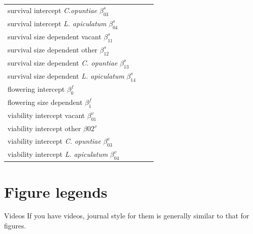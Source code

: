 \documentclass[11pt]{article}
\begin{document}
\begin{table}[]
\begin{tabular}{l|l|l}
    survival intercept \textit{C.opuntiae} $\beta_{03}^s$ & & \\
    survival intercept \textit{L. apiculatum} $\beta_{04}^s$ & & \\
    survival size dependent vacant $\beta_{11}^s$ & & \\
    survival size dependent other $\beta_{12}^s$ & & \\
    survival size dependent \textit{C. opuntiae} $\beta_{13}^s$ & & \\
    survival size dependent \textit{L. apiculatum} $\beta_{14}^s$ & & \\
    \hline
    flowering intercept $\beta_0^f$ & & \\
    flowering size dependent $\beta_1^f$ & & \\
    \hline
    viability intercept vacant $\beta_01^v$ & & \\
    viability intercept other $\beta02^v$ & & \\
    viability intercept \textit{C. opuntiae} $\beta_03^v$ & & \\
    viability intercept \textit{L. apiculatum} $\beta_04^v$ & & 
  \end{tabular}
  \end{table}

\section*{Figure legends}


 Videos
 If you have videos, journal style for them is generally similar to that for
 figures. 




\end{document}
